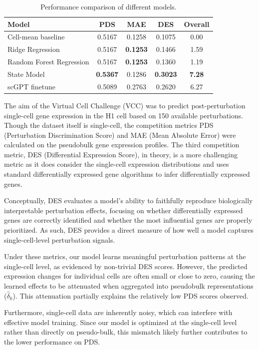 \documentclass{article}
\begin{document}
\begin{table}[t]
\caption{Performance comparison of different models.}
\label{tab:model_comparison}
\centering
\begin{tabular}{lcccc}
\hline
Model  & PDS & MAE & DES & Overall \\
\hline
Cell-mean baseline         & 0.5167 & 0.1258 & 0.1075 & 0.00 \\
Ridge Regression           & 0.5167 & \textbf{0.1253} & 0.1466 & 1.59 \\
Random Forest Regression  & 0.5167 & \textbf{0.1253}  & 0.1360 & 1.19 \\
State Model               & \textbf{0.5367} & 0.1286 & \textbf{0.3023 } & \textbf{7.28} \\
scGPT finetune             & 0.5089 & 0.2763 & 0.2620 & 6.27 \\
\hline
\end{tabular}
\end{table}

The aim of the Virtual Cell Challenge (VCC) was to predict post-perturbation single-cell gene expression in the H1 cell based on 150 available perturbations. Though the dataset itself is single-cell, the competition metrics PDS (Perturbation Discrimination Score) and MAE (Mean Absolute Error) were calculated on the pseudobulk gene expression profiles. The third competition metric, DES (Differential Expression Score), in theory, is a more challenging metric as it does consider the single-cell expression distributions and uses standard differentially expressed gene algorithms to infer differentially expressed genes. 

Conceptually, DES evaluates a model’s ability to faithfully reproduce biologically interpretable perturbation effects, focusing on whether differentially expressed genes are correctly identified and whether the most influential genes are properly prioritized. As such, DES provides a direct measure of how well a model captures single-cell-level perturbation signals.

Under these metrics, our model learns meaningful perturbation patterns at the single-cell level, as evidenced by non-trivial DES scores. However, the predicted expression changes for individual cells are often small or close to zero, causing the learned effects to be attenuated when aggregated into pseudobulk representations (\(\hat{\delta}_k\)). This attenuation partially explains the relatively low PDS scores observed.

Furthermore, single-cell data are inherently noisy, which can interfere with effective model training. Since our model is optimized at the single-cell level rather than directly on pseudo-bulk, this mismatch likely further contributes to the lower performance on PDS.
    
\end{document}
